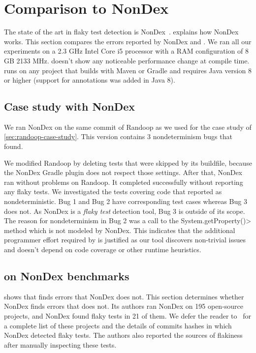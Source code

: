 \section{Comparison to NonDex}

The state of the art in flaky test detection is NonDex~\cite{nondex}.
 explains how NonDex works. This section compares the
errors reported by NonDex and \theDeterminismChecker. We ran all our
experiments on a 2.3 GHz Intel Core i5 processor with a RAM configuration of 8 GB 2133 MHz.
\TheDeterminismChecker doesn't show any noticeable performance change at compile time.
\TheDeterminismChecker runs on any project that builds with Maven or Gradle and requires
Java version 8 or higher (support for annotations was added in Java 8).

\subsection{Case study with NonDex}\label{sec:nondex-randoop}

We ran NonDex on the same commit of Randoop as we used for the case study
of \cref{sec:randoop-case-study}.  This version contains 3 nondeterminism bugs that
\theDeterminismChecker found.

We modified Randoop by deleting tests that were skipped by its buildfile,
because the NonDex Gradle plugin does not respect those settings.
After that, NonDex ran without problems on Randoop.
It completed successfully without reporting any flaky tests.
We investigated the tests covering code that \theDeterminismChecker reported as nondeterministic.
Bug 1 and Bug 2 have corresponding test cases whereas Bug 3 does not.
As NonDex is a \textit{flaky test} detection tool, Bug 3 is outside of its scope.
The reason for nondeterminism in Bug 2 was a call to the \<System.getProperty()> method which
is not modeled by NonDex.
This indicates that the additional programmer effort required by \TheDeterminismChecker is justified
as our tool discovers non-trivial issues and doesn't depend on code coverage or other runtime heuristics.

\subsection{\TheDeterminismChecker on NonDex benchmarks}\label{sec:nondex-benchmarks}

 shows that \theDeterminismChecker finds errors that NonDex does not.
This section determines whether NonDex finds errors that \theDeterminismChecker does not.
Its authors ran NonDex on 195 open-source projects, and NonDex found flaky tests in
21 of them. We defer the reader to~\cite{nondex} for a complete list of these projects
and the details of commits hashes in which NonDex detected flaky tests.
The authors also reported the sources of flakiness
after manually inspecting these tests. 

